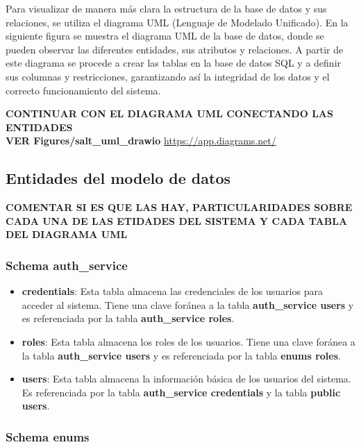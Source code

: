 Para visualizar de manera más clara la estructura de la base de datos y sus relaciones, se utiliza el diagrama UML (Lenguaje de Modelado Unificado). En la siguiente figura se muestra el diagrama UML de la base de datos, donde se pueden observar las diferentes entidades, sus atributos y relaciones. A partir de este diagrama se procede a crear las tablas en la base de datos SQL y a definir sus columnas y restricciones, garantizando así la integridad de los datos y el correcto funcionamiento del sistema.


\textbf{CONTINUAR CON EL DIAGRAMA UML CONECTANDO LAS ENTIDADES  \\ VER Figures/salt\_uml\_drawio}
\url{https://app.diagrams.net/}


\subsection{Entidades del modelo de datos}


\textbf{COMENTAR SI ES QUE LAS HAY, PARTICULARIDADES SOBRE CADA UNA DE LAS ETIDADES DEL SISTEMA Y CADA TABLA DEL DIAGRAMA UML}

 
\subsubsection{Schema auth\_service}

\begin{itemize}

\item \textbf{credentials}: Esta tabla almacena las credenciales de los usuarios para acceder al sistema. Tiene una clave foránea a la tabla \textbf{auth\_service users} y es referenciada por la tabla \textbf{auth\_service roles}.

\item \textbf{roles}: Esta tabla almacena los roles de los usuarios. Tiene una clave foránea a la tabla \textbf{auth\_service users} y es referenciada por la tabla \textbf{enums roles}.

\item \textbf{users}: Esta tabla almacena la información básica de los usuarios del sistema. Es referenciada por la tabla \textbf{auth\_service credentials} y la tabla \textbf{public users}.

\end{itemize}


\subsubsection{Schema enums}

